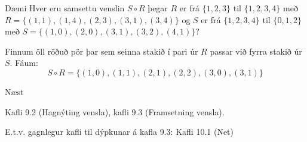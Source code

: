 \documentclass[handout]{beamer}
\begin{document}
\begin{frame}{Dæmi}
Hver eru samsettu venslin $S \circ R$ þegar $R$ er frá $\{1, 2, 3\}$ til $\{1, 2, 3, 4\}$ með $R = \{(1, 1), (1, 4), (2, 3), (3, 1), (3, 4)\}$ og $S$ er frá $\{1, 2, 3, 4\}$ til $\{0, 1, 2\}$ með $S = \{(1, 0), (2, 0), (3, 1), (3, 2), (4, 1)\}$? \pause 

\vspace{0.5cm}
Finnum öll röðuð pör þar sem seinna stakið í pari úr $R$ passar við fyrra stakið úr $S$. Fáum:
\[
 S \circ R = \{(1, 0), (1, 1), (2, 1), (2, 2), (3, 0), (3, 1)\}
\]
\end{frame}

\begin{frame}{Næst}

Kafli 9.2 (Hagnýting vensla), kafli 9.3 (Framsetning vensla).

E.t.v. gagnlegur kafli til dýpkunar á kafla 9.3: Kafli 10.1 (Net)

\end{frame}
\end{document}
